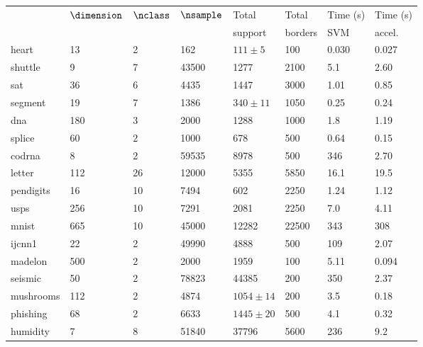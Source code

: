 \begin{tabular}{|l|lllllll|}
	\hline
	& $\dimension$ & $\nclass$ & $\nsample$ & Total & Total & Time (s) & Time (s)\\
	& & & & support & borders & SVM & accel. \\\hline
	heart & 13 & 2 & 162 & $111\pm5$ & 100 & 0.030 & 0.027\\
	shuttle & 9 & 7 & 43500 & 1277 & 2100 & 5.1 & 2.60\\
	sat & 36 & 6 & 4435 & 1447 & 3000 & 1.01 & 0.85 \\
	segment & 19 & 7 & 1386 & $340\pm11$ & 1050 & 0.25 & 0.24 \\
	dna & 180 & 3 & 2000 & 1288 & 1000 & 1.8 & 1.19 \\
	splice & 60 & 2 & 1000 & 678 & 500 & 0.64 & 0.15 \\
	codrna & 8 & 2 & 59535 & 8978 & 500 & 346 & 2.70 \\
	letter & 112 & 26 & 12000 & 5355 & 5850 & 16.1 & 19.5 \\ 
	pendigits & 16 & 10 & 7494 & 602 & 2250 & 1.24 & 1.12 \\
	usps & 256 & 10 & 7291 & 2081 & 2250 & 7.0 & 4.11 \\
	mnist & 665 & 10 & 45000 & 12282 & 22500 & 343 & 308 \\
	ijcnn1 & 22 & 2 & 49990 & 4888 & 500 & 109 & 2.07 \\
	madelon & 500 & 2 & 2000 & 1959 & 100 & 5.11 & 0.094 \\
	seismic & 50 & 2 & 78823 & 44385 & 200 & 350 & 2.37 \\
	mushrooms & 112 & 2 & 4874 & $1054\pm14$ & 200 & 3.5 & 0.18 \\
	phishing & 68 & 2 & 6633 & $1445\pm20$ & 500 & 4.1 & 0.32 \\
	humidity & 7 & 8 & 51840 & 37796 & 5600 & 236 & 9.2 \\ 
	\hline
\end{tabular}

